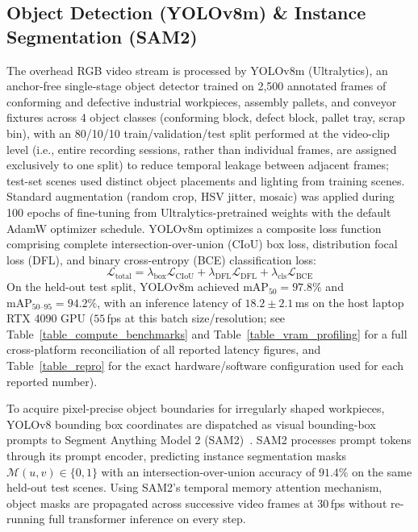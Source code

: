 \documentclass[journal]{IEEEtran}
\begin{document}
\subsection{Object Detection (YOLOv8m) \& Instance Segmentation (SAM2)}
The overhead RGB video stream is processed by YOLOv8m (Ultralytics), an anchor-free single-stage object detector trained on 2,500 annotated frames of conforming and defective industrial workpieces, assembly pallets, and conveyor fixtures across 4 object classes (conforming block, defect block, pallet tray, scrap bin), with an 80/10/10 train/validation/test split performed at the video-clip level (i.e., entire recording sessions, rather than individual frames, are assigned exclusively to one split) to reduce temporal leakage between adjacent frames; test-set scenes used distinct object placements and lighting from training scenes. Standard augmentation (random crop, HSV jitter, mosaic) was applied during 100 epochs of fine-tuning from Ultralytics-pretrained weights with the default AdamW optimizer schedule. YOLOv8m optimizes a composite loss function comprising complete intersection-over-union (CIoU) box loss, distribution focal loss (DFL), and binary cross-entropy (BCE) classification loss:
\begin{equation}
\mathcal{L}_{\text{total}} = \lambda_{\text{box}} \mathcal{L}_{\text{CIoU}} + \lambda_{\text{DFL}} \mathcal{L}_{\text{DFL}} + \lambda_{\text{cls}} \mathcal{L}_{\text{BCE}}
\end{equation}
On the held-out test split, YOLOv8m achieved $\text{mAP}_{50} = 97.8\%$ and $\text{mAP}_{50\text{--}95} = 94.2\%$, with an inference latency of $18.2 \pm 2.1$\,ms on the host laptop RTX 4090 GPU ($55$\,fps at this batch size/resolution; see Table~\ref{table_compute_benchmarks} and Table~\ref{table_vram_profiling} for a full cross-platform reconciliation of all reported latency figures, and Table~\ref{table_repro} for the exact hardware/software configuration used for each reported number).

To acquire pixel-precise object boundaries for irregularly shaped workpieces, YOLOv8 bounding box coordinates are dispatched as visual bounding-box prompts to Segment Anything Model 2 (SAM2)~\cite{aria_023_ravi_2024_sam}. SAM2 processes prompt tokens through its prompt encoder, predicting instance segmentation masks $\mathcal{M}(u,v) \in \{0, 1\}$ with an intersection-over-union accuracy of $91.4\%$ on the same held-out test scenes. Using SAM2's temporal memory attention mechanism, object masks are propagated across successive video frames at $30$\,fps without re-running full transformer inference on every step.
\end{document}
